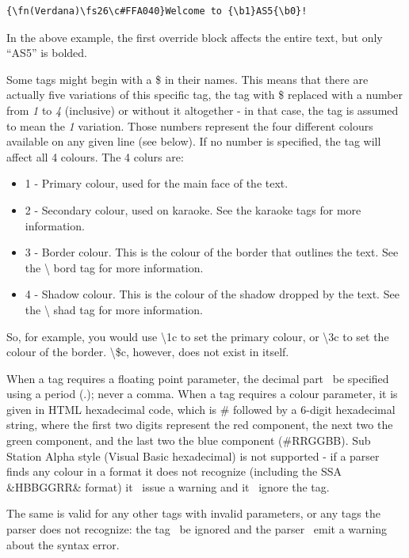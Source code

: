 \documentclass{spec}
\begin{document}
\begin{verbatim}
{\fn(Verdana)\fs26\c#FFA040}Welcome to {\b1}AS5{\b0}!
\end{verbatim}

In the above example, the first override block affects the entire text, but only ``AS5'' is bolded.

Some tags might begin with a \$ in their names. This means that there are actually five variations
of this specific tag, the tag with \$ replaced with a number from \emph{1} to \emph{4} (inclusive)
or without it altogether - in that case, the tag is assumed to mean the \emph{1} variation. Those
numbers represent the four different colours available on any given line (see below). If no number
is specified, the tag will affect all 4 colours. The 4 colurs are:

\begin{itemize}
\item 1 - Primary colour, used for the main face of the text.
\item 2 - Secondary colour, used on karaoke. See the karaoke tags for more information.
\item 3 - Border colour. This is the colour of the border that outlines the text. See the \textbackslash
bord tag for more information.
\item 4 - Shadow colour. This is the colour of the shadow dropped by the text. See the \textbackslash
shad tag for more information.
\end{itemize}

So, for example, you would use \textbackslash 1c to set the primary colour, or \textbackslash 3c to set
the colour of the border. \textbackslash \$c, however, does not exist in itself.

When a tag requires a floating point parameter, the decimal part \must\ be specified using a period (.);
never a comma. When a tag requires a colour parameter, it is given in HTML hexadecimal code, which is
\# followed by a 6-digit hexadecimal string, where the first two digits represent the red component,
the next two the green component, and the last two the blue component (\#RRGGBB). Sub Station Alpha
style (Visual Basic hexadecimal) is not supported - if a parser finds any colour in a format it does
not recognize (including the SSA \&HBBGGRR\& format) it \should\ issue a warning and it \must\ ignore the tag.

The same is valid for any other tags with invalid parameters, or any tags the parser does not recognize:
the tag \must\ be ignored and the parser \must\ emit a warning about the syntax error.
\end{document}
